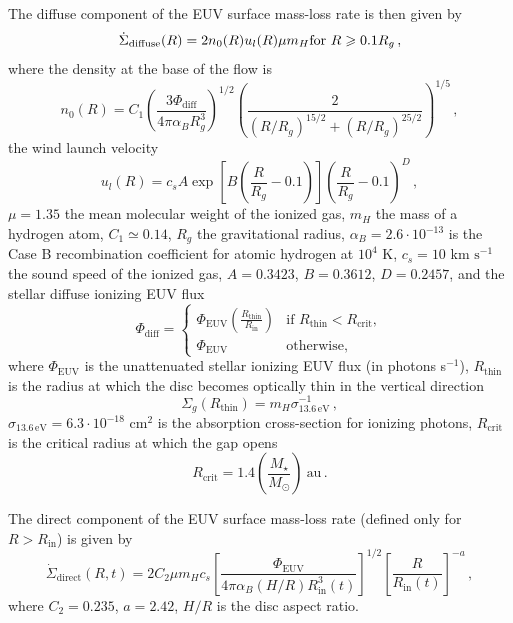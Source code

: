 \documentclass[fleqn,usenatbib]{mnras}
\begin{document}
The diffuse component of the EUV surface mass-loss rate is then given by
\begin{equation}
    \dot{\Sigma}_\mathrm{diffuse}(R) = 2n_0(R)u_l(R)\mu m_H \\ \mathrm{for }\ R\geq 0.1 R_g\,,
\end{equation}
where the density at the base of the flow is
\begin{equation}
    n_0(R) = C_1 \left(\frac{3\Phi_\mathrm{diff}}{4\pi\alpha_B R_g^3}\right)^{1/2} \left(\frac{2}{(R/R_g)^{15/2}+(R/R_g)^{25/2}}\right)^{1/5} \,,
\end{equation}
the wind launch velocity 
\begin{equation}
    u_l(R) = c_s A \exp{\left[B\left(\frac{R}{R_g} - 0.1\right)\right]} \left(\frac{R}{R_g} - 0.1\right)^D \,,
\end{equation}
$\mu = 1.35$ the mean molecular weight of the ionized gas, $m_H$ the mass of a hydrogen atom, $C_1 \simeq 0.14$, $R_g$ the gravitational radius, $\alpha_B = 2.6\cdot10^{-13}$ is the Case B recombination coefficient for atomic hydrogen at $10^4$ K, $c_s = 10$ km $\mathrm{s}^{-1}$ the sound speed of the ionized gas, $A=0.3423$, $B=0.3612$, $D=0.2457$, and the stellar diffuse ionizing EUV flux
\begin{equation}
    \Phi_\mathrm{diff} = 
    \begin{cases}
        \Phi_\mathrm{EUV}\left(\frac{R_\mathrm{thin}}{R_\mathrm{in}}\right) & \text{if } R_\mathrm{thin} < R_\mathrm{crit},\\
        \Phi_\mathrm{EUV} & \text{otherwise},
    \end{cases}
\end{equation}
where $\Phi_\mathrm{EUV}$ is the unattenuated stellar ionizing EUV flux (in photons s$^{-1}$), $R_\mathrm{thin}$ is the radius at which the disc becomes optically thin in the vertical direction
\begin{equation}
    \Sigma_g(R_\mathrm{thin}) = m_H \sigma_\mathrm{13.6\, eV}^{-1} \,,
\end{equation}
$\sigma_\mathrm{13.6\, eV} = 6.3\cdot10^{-18}$ cm$^2$ is the absorption cross-section for ionizing photons, $R_\mathrm{crit}$ is the critical radius at which the gap opens
\begin{equation}
    R_\mathrm{crit} = 1.4 \left(\frac{M_\star}{M_\odot}\right) \ \text{au}\,.
\end{equation}

The direct component of the EUV surface mass-loss rate (defined only for $R>R_\mathrm{in}$) is given by
\begin{equation}
    \dot{\Sigma}_\mathrm{direct}(R, t) = 2 C_2 \mu m_H c_s \left[\frac{\Phi_\mathrm{EUV}}{4\pi\alpha_B(H/R) R_\mathrm{in}^3(t)}\right]^{1/2} \left[\frac{R}{R_\mathrm{in}(t)}\right]^{-a} \,,
\end{equation}
where $C_2 = 0.235$, $a = 2.42$, $H/R$ is the disc aspect ratio.
\end{document}

